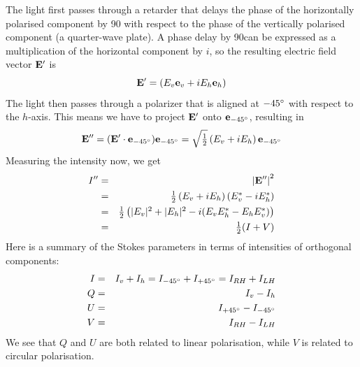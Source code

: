 The light first passes through a retarder that delays the phase of
the horizontally polarised component by 90\degree{} with respect to
the phase of the vertically polarised component (a quarter-wave
plate).
A phase delay by 90\degree can be expressed as a multiplication of the
horizontal component by $i$, so the resulting
electric field vector $\mathbf{E}^\prime$ is
\begin{equation}
  \label{eq:polarization:E_retarded}
  \mathbf{E}^\prime = \left(E_v \mathbf{e}_v +   i E_h \mathbf{e}_h \right) 
\end{equation}
The light then passes through a polarizer that is  aligned at
$-45^\circ$ with respect to the $h$-axis. This means we have to
project $\mathbf{E}^\prime$ onto $\mathbf{e}_{-45^\circ}$, resulting in
\begin{equation}
  \label{eq:polarization:E_retarded_polarized}
  \mathbf{E}^{\prime\prime} 
   = (\mathbf{E}^\prime \cdot \mathbf{e}_{-45^\circ})\mathbf{e}_{-45^\circ} 
   = \sqrt{\textstyle\frac{1}{2}}\left(E_v  +  i E_h  \right) \mathbf{e}_{-45^\circ} 
\end{equation}
Measuring the intensity now, we get
\begin{eqnarray}
  I^{\prime\prime} 
   &=&  \left| \mathbf{E}^{\prime\prime} \right| ^2 \\ \nonumber
   &=& \textstyle\frac{1}{2}\left(E_v +  i E_h  \right)  
     \left(E_v^\ast -  i E_h^\ast  \right)\\ \nonumber
   &=& \textstyle\frac{1}{2} \left( |E_v|^2 + |E_h|^2 - 
        i (E_v E_h^\ast -  E_h E_v^\ast )\right) \\ \nonumber
   &=& \textstyle\frac{1}{2} ( I + V )
  \label{eq:polarization:I_retarded_polarized}
\end{eqnarray}
Here is a summary of the Stokes parameters in terms of intensities of
orthogonal components:
\begin{eqnarray}
  \label{eq:polarization:stokesparam_Idiff_I}
  I &=& I_v + I_h = I_{-45^\circ} + I_{+45^\circ} = I_{RH} + I_{LH}\\
  \label{eq:polarization:stokesparam_Idiff_Q}
  Q &=&   I_v - I_h \\
  \label{eq:polarization:stokesparam_Idiff_U}
  U &=&  I_{+45^\circ} - I_{-45^\circ} \\
  \label{eq:polarization:stokesparam_Idiff_V}
  V &=&  I_{RH} - I_{LH}
\end{eqnarray}
We see that $Q$ and $U$ are both related to linear polarisation, while
$V$ is related to circular polarisation.

